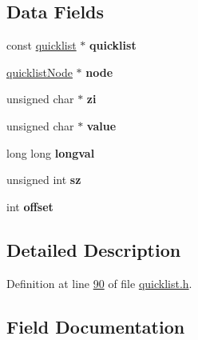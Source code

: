 \subsection*{Data Fields}
\begin{DoxyCompactItemize}
\item 
\mbox{\label{structquicklistEntry_ae79e2864f240c77580a479632f204e5e}} 
const \hyperlink{structquicklist}{quicklist} $\ast$ {\bfseries quicklist}
\item 
\mbox{\label{structquicklistEntry_a447d03cb5ad4500cd90a4ea3f9a9f777}} 
\hyperlink{structquicklistNode}{quicklist\+Node} $\ast$ {\bfseries node}
\item 
\mbox{\label{structquicklistEntry_a874694fe0b87046a740066bd17a1602d}} 
unsigned char $\ast$ {\bfseries zi}
\item 
\mbox{\label{structquicklistEntry_ad6128afc65dff9103f6702f5cea78d84}} 
unsigned char $\ast$ {\bfseries value}
\item 
\mbox{\label{structquicklistEntry_aaa3cf621c17dd34081884ed19d5d49a5}} 
long long {\bfseries longval}
\item 
\mbox{\label{structquicklistEntry_a4b38ddc002996018b8df55926b687619}} 
unsigned int {\bfseries sz}
\item 
\mbox{\label{structquicklistEntry_aa1f3db8120b0872295e984261aeb3d4c}} 
int {\bfseries offset}
\end{DoxyCompactItemize}


\subsection{Detailed Description}


Definition at line \hyperlink{quicklist_8h_source_l00090}{90} of file \hyperlink{quicklist_8h_source}{quicklist.\+h}.



\subsection{Field Documentation}
\mbox{\label{structquicklistEntry_aaa3cf621c17dd34081884ed19d5d49a5}} 
